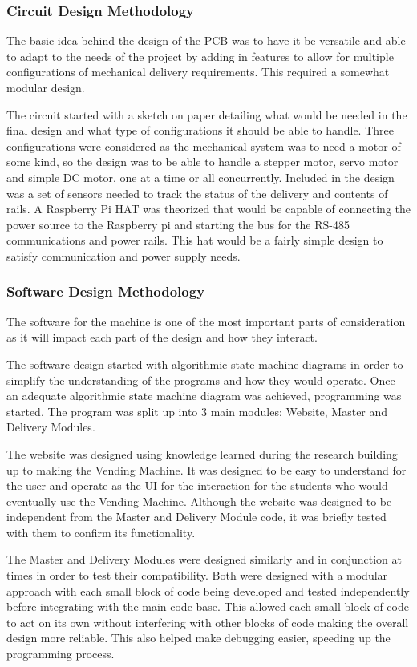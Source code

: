 \documentclass[a4paper,11pt]{article}
\numberwithin{figure}{section}
\numberwithin{table}{section}
\begin{document}
\subsubsection{Circuit Design Methodology}
The basic idea behind the design of the PCB was to have it be versatile and able to adapt to the needs of the project by adding in features to allow for multiple configurations of mechanical delivery requirements. This required a somewhat modular design.

The circuit started with a sketch on paper detailing what would be needed in the final design and what type of configurations it should be able to handle. Three configurations were considered as the mechanical system was to need a motor of some kind, so the design was to be able to handle a stepper motor, servo motor and simple DC motor, one at a time or all concurrently. Included in the design was a set of sensors needed to track the status of the delivery and contents of rails.
A Raspberry Pi HAT was theorized that would be capable of connecting the power source to the Raspberry pi and starting the bus for the RS-485 communications and power rails. This hat would be a fairly simple design to satisfy communication and power supply needs.



\subsubsection{Software Design Methodology}
The software for the machine is one of the most important parts of consideration as it will impact each part of the design and how they interact.

The software design started with algorithmic state machine diagrams in order to simplify the understanding of the programs and how they would operate. Once an adequate algorithmic state machine diagram was achieved, programming was started. The program was split up into 3 main modules: Website, Master and Delivery Modules. 

The website was designed using knowledge learned during the research building up to making the Vending Machine. It was designed to be easy to understand for the user and operate as the UI for the interaction for the students who would eventually use the Vending Machine. Although the website was designed to be independent from the Master and Delivery Module code, it was briefly tested with them to confirm its functionality.

The Master and Delivery Modules were designed similarly and in conjunction at times in order to test their compatibility. Both were designed with a modular approach with each small block of code being developed and tested independently before integrating with the main code base. This allowed each small block of code to act on its own without interfering with other blocks of code making the overall design more reliable. This also helped make debugging easier, speeding up the programming process.
\end{document}
